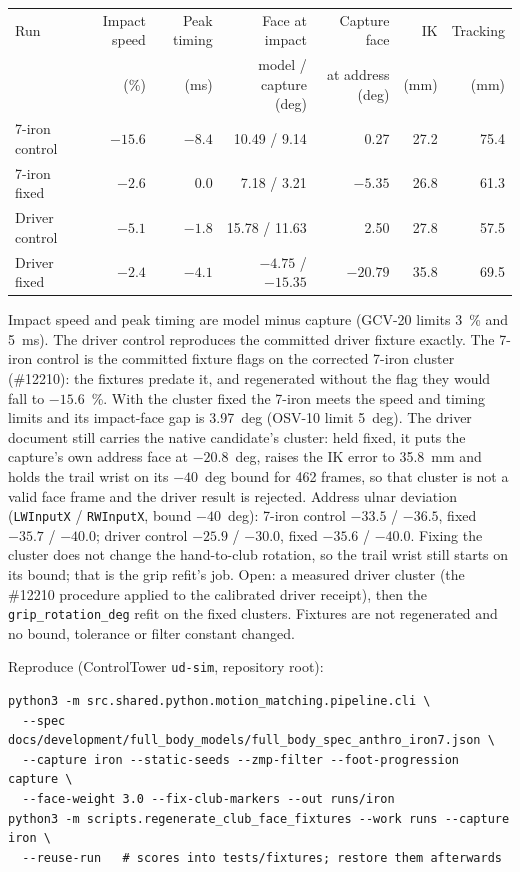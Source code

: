 \documentclass[11pt,a4paper]{article}
\begin{document}
\begin{center}
\begin{tabular}{lrrrrrr}
\hline
Run & Impact speed & Peak timing & Face at impact & Capture face & IK & Tracking \\
 & (\%) & (ms) & model / capture (deg) & at address (deg) & (mm) & (mm) \\
\hline
7-iron control & $-15.6$ & $-8.4$ & 10.49 / 9.14 & 0.27 & 27.2 & 75.4 \\
7-iron fixed & $-2.6$ & $0.0$ & 7.18 / 3.21 & $-5.35$ & 26.8 & 61.3 \\
Driver control & $-5.1$ & $-1.8$ & 15.78 / 11.63 & 2.50 & 27.8 & 57.5 \\
Driver fixed & $-2.4$ & $-4.1$ & $-4.75$ / $-15.35$ & $-20.79$ & 35.8 & 69.5 \\
\hline
\end{tabular}
\end{center}
Impact speed and peak timing are model minus capture (GCV-20 limits 3~\% and
5~ms). The driver control reproduces the committed driver fixture exactly. The
7-iron control is the committed fixture flags on the corrected 7-iron cluster
(\#12210): the fixtures predate it, and regenerated without the flag they would
fall to $-15.6$~\%. With the cluster fixed the 7-iron meets the speed and
timing limits and its impact-face gap is 3.97~deg (OSV-10 limit 5~deg). The
driver document still carries the native candidate's cluster: held fixed, it
puts the capture's own address face at $-20.8$~deg, raises the IK error to
35.8~mm and holds the trail wrist on its $-40$~deg bound for 462 frames, so
that cluster is not a valid face frame and the driver result is rejected.
Address ulnar deviation (\texttt{LWInputX} / \texttt{RWInputX}, bound
$-40$~deg): 7-iron control $-33.5$ / $-36.5$, fixed $-35.7$ / $-40.0$; driver
control $-25.9$ / $-30.0$, fixed $-35.6$ / $-40.0$. Fixing the cluster does
not change the hand-to-club rotation, so the trail wrist still starts on its
bound; that is the grip refit's job. Open: a measured driver cluster (the
\#12210 procedure applied to the calibrated driver receipt), then the
\texttt{grip\_rotation\_deg} refit on the fixed clusters. Fixtures are not
regenerated and no bound, tolerance or filter constant changed.

Reproduce (ControlTower \texttt{ud-sim}, repository root):
\begin{verbatim}
python3 -m src.shared.python.motion_matching.pipeline.cli \
  --spec docs/development/full_body_models/full_body_spec_anthro_iron7.json \
  --capture iron --static-seeds --zmp-filter --foot-progression capture \
  --face-weight 3.0 --fix-club-markers --out runs/iron
python3 -m scripts.regenerate_club_face_fixtures --work runs --capture iron \
  --reuse-run   # scores into tests/fixtures; restore them afterwards
\end{verbatim}
\end{document}
